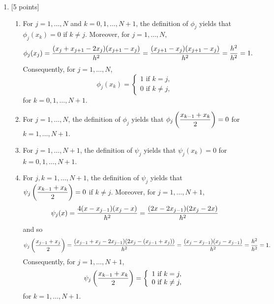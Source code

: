 \begin{solution}
\begin{enumerate}
\item {[5 points]}
\begin{enumerate}
\item For $j=1,\ldots,N$ and $k=0,1,\ldots,N+1$, the definition of $\phi_j$ yields that $\phi_j(x_k)=0$ if $k\ne j$. Moreover, for $j=1,\ldots,N$,
\[
\phi_j(x_j)={(x_j+x_{j+1}-2x_j)(x_{j+1}-x_j) \over h^2}={(x_{j+1}-x_j)(x_{j+1}-x_j) \over h^2}={h^2 \over h^2}=1.
\]
Consequently, for $j=1,\ldots,N$,
\[ \phi_j(x_k) = \left\{ \begin{array}{l}
1\mbox{ if }k=j, \\
0\mbox{ if }k\ne j,
\end{array}\right. \]
for $k=0,1,\ldots,N+1$.
\\
\item For $j=1,\ldots,N$, the definition of $\phi_j$ yields that $\displaystyle{\phi_j\left({x_{k-1}+x_k \over 2}\right)=0}$ for $k=1,\ldots,N+1$.
\\
\item For $j=1,\ldots,N+1$, the definition of $\psi_j$ yields that $\psi_j(x_k)=0$ for $k=0,1,\ldots,N+1$.
\\
\item For $j,k=1,\ldots,N+1$, the definition of $\psi_j$ yields that $\displaystyle{\psi_j\left({x_{k-1}+x_k \over 2}\right)=0}$ if $k\ne j$. Moreover, for $j=1,\ldots,N+1$,
\[
\psi_j(x)={4(x-x_{j-1})(x_j-x) \over h^2}={(2x-2x_{j-1})(2x_j-2x) \over h^2}
\]
and so
\[
\psi_j\left({x_{j-1}+x_j \over 2}\right)={(x_{j-1}+x_j-2x_{j-1})(2x_j-(x_{j-1}+x_j)) \over h^2}={(x_j-x_{j-1})(x_j-x_{j-1}) \over h^2}={h^2 \over h^2}=1.
\]
Consequently, for $j=1,\ldots,N+1$,
\[ \psi_j\left({x_{k-1}+x_k \over 2}\right) = \left\{ \begin{array}{l}
1\mbox{ if }k=j, \\
0\mbox{ if }k\ne j,
\end{array}\right. \]
for $k=1,\ldots,N+1$.
\\
\end{enumerate}

\end{enumerate}
\end{solution}
